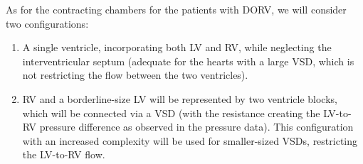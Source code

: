 
As for the contracting chambers for the patients with DORV, we will consider two configurations:
\begin{enumerate}
\item A single ventricle, incorporating both LV and RV, while neglecting the interventricular septum (adequate for the hearts with a large VSD, which is not restricting the flow between the two ventricles).
\item RV and a borderline-size LV will be represented by two ventricle blocks, which will be connected via a VSD (with the resistance creating the LV-to-RV pressure difference as observed in the pressure data). This  configuration with an increased complexity will be used for smaller-sized VSDs, restricting the LV-to-RV flow. 
 \end{enumerate}





